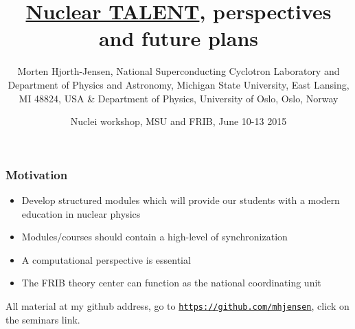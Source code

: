 \documentclass{beamer}
\begin{document}







\title{\href{{http://www.nucleartalent.org}}{Nuclear TALENT}, perspectives and future plans}


\author{Morten Hjorth-Jensen, National Superconducting Cyclotron Laboratory and Department of Physics and Astronomy, Michigan State University, East Lansing, MI 48824, USA {\&} Department of Physics, University of Oslo, Oslo, Norway\inst{}}
\institute{}

\date{Nuclei workshop, MSU and FRIB, June 10-13 2015
}

\begin{frame}
\titlepage
\end{frame}

\begin{frame}
\frametitle{Motivation}

\begin{block}{}
\begin{itemize}
\item Develop structured modules which will provide our students with a modern education in nuclear physics

\item Modules/courses should contain a high-level of synchronization

\item A computational perspective is essential

\item The FRIB theory center can function as the national coordinating unit
\end{itemize}

\noindent
All material at my github address, go to \href{{https://github.com/mhjensen}}{\nolinkurl{https://github.com/mhjensen}}, click on the seminars link.
\end{block}
\end{frame}
\end{document}

